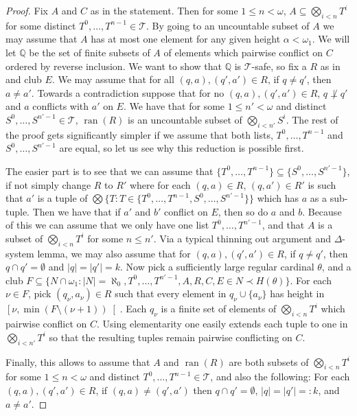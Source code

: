 \documentclass[a4paper,noamsfonts]{amsart}
\theoremstyle{definition}
\newcommand{\Q}{\mathbb{Q}}
\newcommand{\seb}{\subseteq}
\newcommand{\setm}{\setminus}
\newcommand{\es}{\emptyset}
\newcommand{\1}{\mathbf{1}}
\newcommand{\T}{\mathcal{T}}
\DeclareMathOperator{\ran}{ran}
\begin{document}
\begin{proof}
  Fix $A$ and $C$ as in the statement. Then for some
  $1 \le n < \omega$, $A \seb \bigotimes_{i < n}T^{i}$ for some
  distinct $T^{0},\dots,T^{n-1} \in \T$.  By going to an uncountable
  subset of $A$ we may assume that $A$ has at most one element for any
  given height $\alpha < \omega_{1}$. We will let
  $\mathbb{Q}$ be the set of finite subsets of $A$ of elements which pairwise
  conflict on $C$ ordered by reverse inclusion.
  We want to show that $\Q$ is $\T$-safe,
  so fix a $R$ as in  and club $E$. We may assume that
  for all $(q,a),(q',a') \in R$, if $q \neq q'$, then $a \neq a'$.
  Towards
  a contradiction suppose that for no $(q,a),(q',a') \in R$,
  $q \not\perp q'$ and $a$ conflicts with $a'$ on $E$.
  We have that
  for some $1 \le n' < \omega$ and
  distinct $S^{0},\dots,S^{n'-1} \in \T$,
  $\ran(R)$ is an uncountable subset of $\bigotimes_{i < n'}S^{i}$. The rest
  of the proof gets significantly simpler if we assume that both lists,
  $T^{0},\dots,T^{n-1}$ and $S^{0},\dots,S^{n'-1}$ are equal, so let us
  see why this reduction is possible first.

  The easier part is to see that we can assume that
  $\{T^{0},\dots,T^{n-1}\} \seb \{S^{0},\dots,S^{n'-1}\}$, if not
  simply change $R$ to $R'$ where for each $(q,a) \in R$, $(q,a') \in R'$
  is such that $a'$ is a tuple of
  $\bigotimes\{T : T \in \{T^{0},\dots,T^{n-1},S^{0},\dots,S^{n'-1}\}\}$ which
  has $a$ as a sub-tuple. Then we have that if $a'$ and $b'$ conflict on $E$,
  then so do $a$ and $b$. Because of this we can assume that we only
  have one list $T^{0},\dots,T^{n'-1}$, and that $A$ is a subset
  of $\bigotimes_{i < n}T^{i}$ for some $n \le n'$. Via a typical thinning out
  argument and $\Delta$-system lemma, we may also assume that
  for $(q,a),(q',a') \in R$, if $q \neq q'$, then $q \cap q' = \es$
  and $|q| = |q'| = k$. Now
  pick a sufficiently large regular cardinal $\theta$, and a club
  $F \seb \{N \cap \omega_{1} : |N| = \aleph_{0}, T^{0},\dots,T^{n'-1},
  A,R,C,E \in N \prec H(\theta)\}$. For each $\nu \in F$,
  pick $(q_{\nu},a_{\nu}) \in R$
  such that every element in $q_{\nu} \cup \{a_{\nu}\}$ has height
  in $\left[\nu,\min(F\setm(\nu + 1))\right[$. Each $q_{\nu}$ is a finite set of
  elements of $\bigotimes_{i<n}T^{i}$ which pairwise conflict on $C$.
  Using elementarity one easily extends each tuple to one
  in $\bigotimes_{i < n'}T^{i}$ so that the resulting tuples remain
  pairwise conflicting on $C$.

  Finally, this allows to assume that $A$ and $\ran(R)$ are both
  subsets of $\bigotimes_{i < n}T^{i}$ for some $1 \le n < \omega$ and
  distinct $T^{0},\dots,T^{n-1} \in \T$, and also the following:
  For each $(q,a),(q',a') \in R$, if $(q,a) \neq (q',a')$ then
  $q \cap q' = \es$, $|q| = |q'| =: k$, and $a \neq a'$.


\end{proof}
\end{document}
